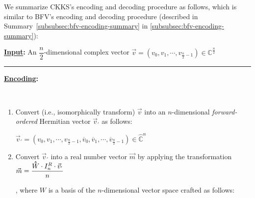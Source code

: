 We summarize CKKS's encoding and decoding procedure as follows, which is similar to BFV's encoding and decoding procedure (described in Summary~\ref*{subsubsec:bfv-encoding-summary} in \autoref{subsubsec:bfv-encoding-summary}):

\begin{tcolorbox}[title={\textbf{\tboxlabel{\ref*{subsec:ckks-encoding-decoding}} CKKS's Encoding and Decoding}}]

\textbf{\underline{Input}:} An $\dfrac{n}{2}$-dimensional complex vector $\vec{v} = (v_0, v_1, \cdots, v_{\frac{n}{2}-1}) \in \mathbb{C}^{\frac{n}{2}}$

\par\noindent\rule{\textwidth}{0.4pt}

\textbf{\underline{Encoding}:}

$ $

\begin{enumerate}
\item Convert (i.e., isomorphically transform) $\vec{v}$ into an $n$-dimensional \textit{forward-ordered} Hermitian vector $\vec{v}_{'}$ as follows:

$\vec{v}_{'} = (v_0, v_1, \cdots, v_{\frac{n}{2}-1}, \overline v_0, \overline v_1, \cdots, \overline v_{\frac{n}{2}-1}) \in \mathbb{\hat C}^{n}$

\item Convert $\vec{v}_{'}$ into a real number vector $\vec{m}$ by applying the transformation $\vec{m} = \dfrac{\hathat W \cdot I_n^R \cdot \vec{v}_{'}}{n}$

, where $W$ is a basis of the $n$-dimensional vector space crafted as follows: 

$ $



\end{enumerate}
\end{tcolorbox}
